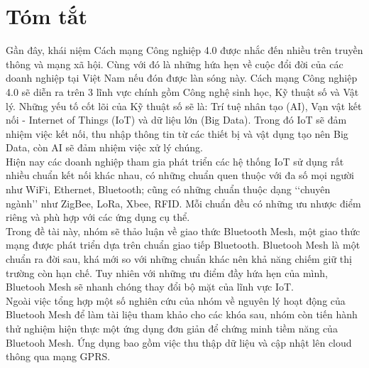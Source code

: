 \cleardoublepage
\chapter*{Tóm tắt}
\vspace{1.0cm}
Gần đây, khái niệm Cách mạng Công nghiệp 4.0 được nhắc đến nhiều trên truyền thông và mạng xã hội. Cùng với đó là những hứa hẹn về cuộc đổi đời của các doanh nghiệp tại Việt Nam nếu đón được làn sóng này. Cách mạng Công nghiệp 4.0 sẽ diễn ra trên 3 lĩnh vực chính gồm Công nghệ sinh học, Kỹ thuật số và Vật lý. Những yếu tố cốt lõi của Kỹ thuật số sẽ là: Trí tuệ nhân tạo (AI), Vạn vật kết nối - Internet of Things (IoT) và dữ liệu lớn (Big Data)\cite{cmcn}. Trong đó IoT sẽ đảm nhiệm việc kết nối, thu nhập thông tin từ các thiết bị và vật dụng tạo nên Big Data, còn AI sẽ đảm nhiệm việc xử lý chúng.\\

Hiện nay các doanh nghiệp tham gia phát triển các hệ thống IoT sử dụng rất nhiều chuẩn kết nối khác nhau, có những chuẩn quen thuộc với đa số mọi người như WiFi, Ethernet, Bluetooth; cũng có những chuẩn thuộc dạng \lq\lq{}chuyên ngành\rq\rq{} như ZigBee, LoRa, Xbee, RFID. Mỗi chuẩn đều có những ưu nhược điểm riêng và phù hợp với các ứng dụng cụ thể.\\

Trong đề tài này, nhóm sẽ thảo luận về giao thức Bluetooth Mesh, một giao thức mạng được phát triển dựa trên chuẩn giao tiếp Bluetooth. Bluetooh Mesh là một chuẩn ra đời sau, khá mới so với những chuẩn khác nên khả năng chiếm giữ thị trường còn hạn chế. Tuy nhiên với những ưu điểm đầy hứa hẹn của mình, Bluetooh Mesh sẽ nhanh chóng thay đổi bộ mặt của lĩnh vực IoT.\\

Ngoài việc tổng hợp một số nghiên cứu của nhóm về nguyên lý hoạt động của Bluetooh Mesh để làm tài liệu tham khảo cho các khóa sau, nhóm còn tiến hành thử nghiệm hiện thực một ứng dụng đơn giản để chứng minh tiềm năng của Bluetooh Mesh. Ứng dụng bao gồm việc thu thập dữ liệu và cập nhật lên cloud thông qua mạng GPRS.


\vskip0.5cm


